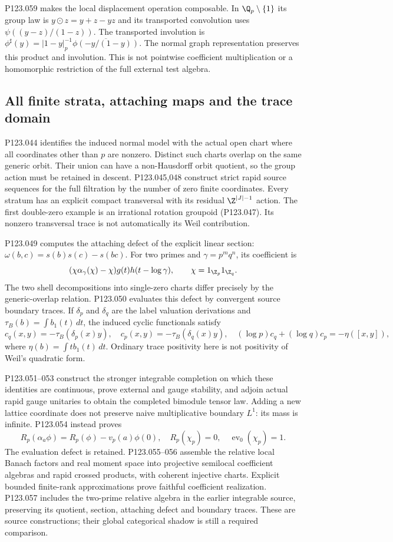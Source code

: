 P123.059 makes the local displacement operation composable. In
$\Q_p\setminus\{1\}$ its group law is $y\odot z=y+z-yz$ and its
transported convolution uses $\psi((y-z)/(1-z))$. The transported
involution is
$\phi^\sharp(y)=|1-y|_p^{-1}\overline{\phi(-y/(1-y))}$.
The normal graph representation preserves this product and involution.
This is not pointwise coefficient multiplication or a homomorphic
restriction of the full external test algebra.

\subsection{All finite strata, attaching maps and the trace domain}
P123.044 identifies the induced normal model with the actual open chart
where all coordinates other than $p$ are nonzero. Distinct such charts
overlap on the same generic orbit. Their union can have a non-Hausdorff
orbit quotient, so the group action must be retained in descent.
P123.045,048 construct strict rapid source sequences for the full filtration
by the number of zero finite coordinates. Every stratum has an explicit
compact transversal with its residual $\Z^{|J|-1}$ action. The first
double-zero example is an irrational rotation groupoid (P123.047).
Its nonzero transversal trace is not automatically its Weil contribution.

P123.049 computes the attaching defect of the explicit linear section:
$\omega(b,c)=s(b)s(c)-s(bc)$. For two primes and
$\gamma=p^mq^n$, its coefficient is
\[
 (\chi\alpha_\gamma(\chi)-\chi)g(t)h(t-\log\gamma),
 \qquad \chi=1_{\Z_p}1_{\Z_q}.
\]
The two shell decompositions into single-zero charts differ precisely by
the generic-overlap relation. P123.050 evaluates this defect by convergent
source boundary traces. If $\delta_p$ and $\delta_q$ are the label
valuation derivations and $\tau_B(b)=\int b_1(t)\,dt$, the induced cyclic
functionals satisfy
\[
 c_q(x,y)=-\tau_B(\delta_p(x)y),\quad
 c_p(x,y)=-\tau_B(\delta_q(x)y),\quad
 (\log p)c_q+(\log q)c_p=-\eta([x,y]),
\]
where $\eta(b)=\int t b_1(t)\,dt$. Ordinary trace positivity here is
not positivity of Weil's quadratic form.

P123.051--053 construct the stronger integrable completion on which these
identities are continuous, prove external and gauge stability, and adjoin
actual rapid gauge unitaries to obtain the completed bimodule tensor law.
Adding a new lattice coordinate does not preserve naive multiplicative
boundary $L^1$: its mass is infinite. P123.054 instead proves
\[
 R_p(\alpha_a\phi)=R_p(\phi)-v_p(a)\phi(0),
 \quad R_p(\chi_p)=0,\quad\operatorname{ev}_0(\chi_p)=1.
\]
The evaluation defect is retained. P123.055--056 assemble the relative
local Banach factors and real moment space into projective semilocal
coefficient algebras and rapid crossed products, with coherent injective
charts. Explicit bounded finite-rank approximations prove faithful
coefficient realization. P123.057 includes the two-prime relative algebra
in the earlier integrable source, preserving its quotient, section,
attaching defect and boundary traces. These are source constructions;
their global categorical shadow is still a required comparison.

